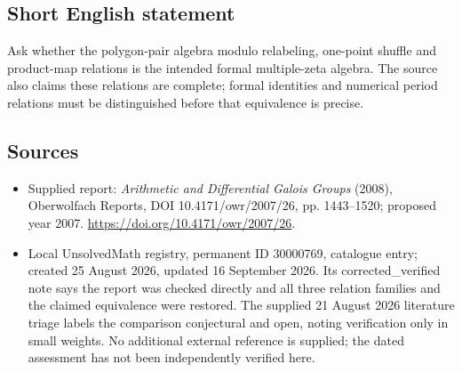 \documentclass[11pt]{article}
\begin{document}
\subsection{Short English statement}
Ask whether the polygon-pair algebra modulo relabeling, one-point shuffle and product-map relations is the intended formal multiple-zeta algebra. The source also claims these relations are complete; formal identities and numerical period relations must be distinguished before that equivalence is precise.
\subsection{Sources}
\begin{itemize}
\item Supplied report: \emph{Arithmetic and Differential Galois Groups} (2008), Oberwolfach Reports, DOI 10.4171/owr/2007/26, pp. 1443--1520; proposed year 2007. \url{https://doi.org/10.4171/owr/2007/26}.
\item Local UnsolvedMath registry, permanent ID 30000769, catalogue entry; created 25 August 2026, updated 16 September 2026. Its corrected\_verified note says the report was checked directly and all three relation families and the claimed equivalence were restored. The supplied 21 August 2026 literature triage labels the comparison conjectural and open, noting verification only in small weights. No additional external reference is supplied; the dated assessment has not been independently verified here.
\end{itemize}
\end{document}
